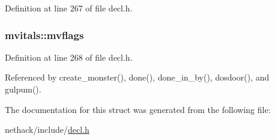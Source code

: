 Definition at line 267 of file decl.\+h.

\hypertarget{structmvitals_a51369b55e24dc02d3f5768b8f5b01381}{
\subsubsection[{mvflags}]{ mvitals\+::mvflags}}\label{structmvitals_a51369b55e24dc02d3f5768b8f5b01381}


Definition at line 268 of file decl.\+h.



Referenced by create\+\_\+monster(), done(), done\+\_\+in\+\_\+by(), dosdoor(), and gulpum().



The documentation for this struct was generated from the following file\+:\begin{DoxyCompactItemize}
\item 
nethack/include/\hyperlink{decl_8h}{decl.\+h}\end{DoxyCompactItemize}
